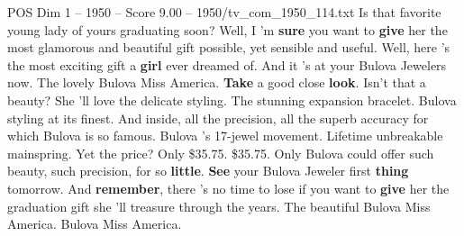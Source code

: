 \begin{textsample}{POS Dim 1 – 1950 – Score 9.00 – 1950/tv\_com\_1950\_114.txt}  \label{ex:f1_pos_009}
Is that favorite young lady of yours graduating soon?
Well, I 'm \textbf{sure} you want to \textbf{give} her the most glamorous and beautiful gift possible, yet sensible and useful.
Well, here 's the most exciting gift a \textbf{girl} ever dreamed of.
And it 's at your Bulova Jewelers now.
The lovely Bulova Miss America. \textbf{Take} a good close \textbf{look}.
Isn't that a beauty?
She 'll love the delicate styling.
The stunning expansion bracelet.
Bulova styling at its finest.
And inside, all the precision, all the superb accuracy for which Bulova is so famous.
Bulova 's 17-jewel movement.
Lifetime unbreakable mainspring.
Yet the price?
Only \$35.75. \$35.75.
Only Bulova could offer such beauty, such precision, for so \textbf{little}. \textbf{See} your Bulova Jeweler first \textbf{thing} tomorrow.
And \textbf{remember}, there 's no time to lose if you want to \textbf{give} her the graduation gift she 'll treasure through the years.
The beautiful Bulova Miss America.
Bulova Miss America.

\end{textsample}

